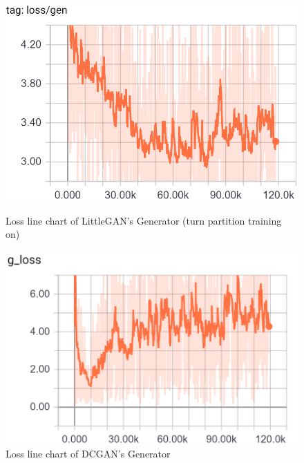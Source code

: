     \begin{figure}
        \begin{minipage}[t]{0.49\linewidth}
            \centering
            \includegraphics[width=\textwidth]{figures/loss_part_on_g.png}
            \caption{Loss line chart of LittleGAN's Generator (turn partition training on)}
            \label{loss_part_on_g}
        \end{minipage}
            \hfill
        \begin{minipage}[t]{0.49\linewidth}
            \centering
            \includegraphics[width=\textwidth]{figures/loss_dcgan_g.png}
            \caption{Loss line chart of DCGAN's Generator}
            \label{loss_dcgan_g}
        \end{minipage}
    \end{figure}

